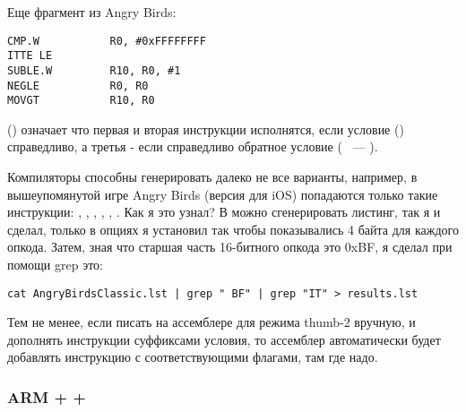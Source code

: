Еще фрагмент из Angry Birds:

\begin{lstlisting}[caption=Angry Birds Classic]
CMP.W           R0, #0xFFFFFFFF
ITTE LE
SUBLE.W         R10, R0, #1
NEGLE           R0, R0
MOVGT           R10, R0
\end{lstlisting}

 () означает что первая и вторая инструкции исполнятся, если 
условие  () справедливо,
а третья - если справедливо обратное условие ( ~--- ).

Компиляторы способны генерировать далеко не все варианты, например, в вышеупомянутой игре Angry Birds
(версия  для iOS) попадаются только такие инструкции: , , , , 
, .
\index{\GrepUsage}
Как я это узнал? В \IDA можно сгенерировать листинг, так я и сделал, только в опциях я установил так 
чтобы показывались 4 байта для каждого опкода. Затем, зная что старшая часть 16-битного опкода  
это 0xBF, я сделал при помощи grep это:

\begin{lstlisting}
cat AngryBirdsClassic.lst | grep " BF" | grep "IT" > results.lst
\end{lstlisting}

Тем не менее, если писать на ассемблере для режима thumb-2 вручную, и дополнять инструкции суффиксами
условия, то ассемблер автоматически будет добавлять инструкцию  с соответствующими флагами, там
где надо.

\subsubsection{ARM + \NonOptimizingXcode + \ARMMode}

